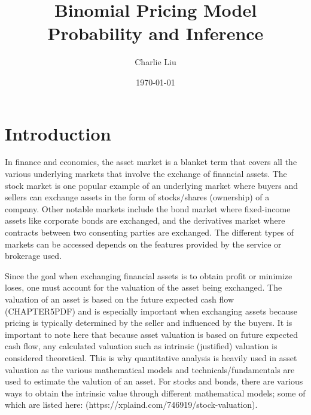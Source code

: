 \documentclass[12pt, letterpaper]{article}
\begin{document}
\title{Binomial Pricing Model \\
\large Probability and Inference}
\author{Charlie Liu}
\date{\today}
\maketitle

\section{Introduction}

In finance and economics, the asset market is a blanket term that covers all the various underlying markets that involve the exchange of financial assets.
The stock market is one popular example of an underlying market where buyers and sellers can exchange assets in the form of stocks/shares (ownership) of a company.
Other notable markets include the bond market where fixed-income assets like corporate bonds are exchanged, and the derivatives market where contracts between two consenting parties are exchanged.
The different types of markets can be accessed depends on the features provided by the service or brokerage used.


Since the goal when exchanging financial assets is to obtain profit or minimize loses, one must account for the valuation of the asset being exchanged.
The valuation of an asset is based on the future expected cash flow (CHAPTER5PDF) and is especially important when exchanging assets because pricing is typically determined by the seller and influenced by the buyers.
It is important to note here that because asset valuation is based on future expected cash flow, any calculated valuation such as intrinsic (justified) valuation is considered theoretical.
This is why quantitative analysis is heavily used in asset valuation as the various mathematical models and technicals/fundamentals are used to estimate the valution of an asset.
For stocks and bonds, there are various ways to obtain the intrinsic value through different mathematical models; some of which are listed here: (https://xplaind.com/746919/stock-valuation).
\end{document}
